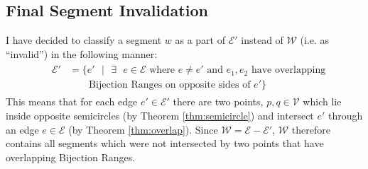 \documentclass[12pt]{article}
\begin{document}
\subsection*{Final Segment Invalidation}
I have decided to classify a segment $w$ as a part of $\mathcal{E}'$ instead of
$\mathcal{W}$ (i.e. as ``invalid'') in the following manner:
\begin{align*}
&\begin{aligned}
\mathcal{E}' &= \{e'\text{ }|\text{ }\exists\text{ }e \in \mathcal{E} \text{ where } e \neq e'
\text{ and } e_1,e_2 \text{ have overlapping}\\
&\qquad \text{Bijection Ranges on opposite sides of } e'\}
\end{aligned}
\end{align*}
This means that for each edge $e' \in \mathcal{E}'$ there are two points,
$p,q \in \mathcal{V}$ which lie inside opposite semicircles
(by Theorem \ref{thm:semicircle}) and intersect $e'$ through an edge $e \in \mathcal{E}$
(by Theorem \ref{thm:overlap}). Since $\mathcal{W} = \mathcal{E} - \mathcal{E}'$,
$\mathcal{W}$ therefore contains all segments which were not intersected by two
points that have overlapping Bijection Ranges.
\end{document}
